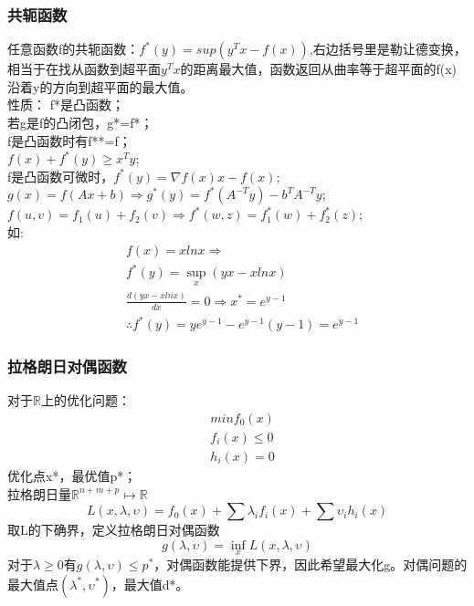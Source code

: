 \documentclass[UTF8]{article}
\begin{document}
\subsubsection{共轭函数}
任意函数f的共轭函数：$f^*(y)=sup(y^Tx-f(x))$,右边括号里是勒让德变换，相当于在找从函数到超平面$y^Tx$的距离最大值，函数返回从曲率等于超平面的f(x)沿着y的方向到超平面的最大值。\\
性质：
f*是凸函数；\\
若g是f的凸闭包，g*=f*；\\
f是凸函数时有f**=f；\\
$f(x)+f^*(y)\geqslant x^Ty$;\\
f是凸函数可微时，$f^*(y)=\nabla f(x)x-f(x)$;\\
$g(x)=f(Ax+b)\Rightarrow g^*(y)=f^*(A^{-T}y)-b^TA^{-T}y$;\\
$f(u,v)=f_1(u)+f_2(v)\Rightarrow f^*(w,z)=f_1^*(w)+f_2^*(z)$;\\
如:
\begin{equation}
    \begin{split}
    &f(x)=xlnx \Rightarrow \\
&f^*(y)=\sup_x(yx-xlnx)\\
&\frac{d(yx-xlnx)}{dx}=0\Rightarrow x^*=e^{y-1}\\
&\therefore f^*(y)=ye^{y-1}-e^{y-1}(y-1)=e^{y-1}
    \end{split}
\end{equation}


\subsubsection{拉格朗日对偶函数}
对于$\mathbb{R}$上的优化问题：
\begin{equation}
\begin{split}
&minf_0(x)\\
&f_i(x)\leqslant 0\\
&h_i(x)=0
\end{split}
\end{equation} 
优化点x*，最优值p*；\\
拉格朗日量$\mathbb R^{n+m+p}\mapsto \mathbb R$
\begin{equation}
L(x,\lambda, \upsilon)=f_0(x)+\sum \lambda_if_i(x)+\sum \upsilon _ih_i(x)
\end{equation}
 取L的下确界，定义拉格朗日对偶函数
 \begin{equation}
    g(\lambda, \upsilon)=\inf_x L(x,\lambda, \upsilon)
\end{equation}
对于$\lambda \geqslant 0$有$g(\lambda, \upsilon) \leqslant p^*$，对偶函数能提供下界，因此希望最大化g。对偶问题的最大值点$(\lambda^*,\upsilon ^*)$，最大值d*。
\end{document}
